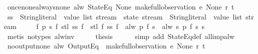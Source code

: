 \begin{isabellebody}
{\isafoldproof}%
%
\isadelimproof
\isanewline
%
\endisadelimproof
\isanewline
{}\isamarkupfalse%
\ once{\isacharunderscore}none{\isacharunderscore}always{\isacharunderscore}none{\isacharcolon}\ {\isachardoublequoteopen}alw\ {\isacharparenleft}StateEq\ None{\isacharparenright}\ {\isacharparenleft}make{\isacharunderscore}full{\isacharunderscore}observation\ e\ None\ r\ t{\isacharparenright}{\isachardoublequoteclose}\isanewline
%
\isadelimproof
%
\endisadelimproof
%
\isatagproof
{}\isamarkupfalse%
\ {\isacharminus}\isanewline
\ \ \isamarkupfalse%
\ ss\ {\isacharcolon}{\isacharcolon}\ {\isachardoublequoteopen}{\isacharparenleft}{\isacharparenleft}String{\isachardot}literal\ {\isasymtimes}\ value\ list{\isacharparenright}\ stream\ {\isasymRightarrow}\ state\ stream{\isacharparenright}\ {\isasymRightarrow}\ {\isacharparenleft}String{\isachardot}literal\ {\isasymtimes}\ value\ list{\isacharparenright}\ stream{\isachardoublequoteclose}\ \isanewline
\ \ \ \ {\isachardoublequoteopen}{\isasymforall}f\ p\ s{\isachardot}\ f\ {\isacharparenleft}stl\ {\isacharparenleft}ss\ f{\isacharparenright}{\isacharparenright}\ {\isasymnoteq}\ stl\ {\isacharparenleft}f\ {\isacharparenleft}ss\ f{\isacharparenright}{\isacharparenright}\ {\isasymor}\ alw\ p\ {\isacharparenleft}f\ s{\isacharparenright}\ {\isacharequal}\ alw\ {\isacharparenleft}{\isasymlambda}s{\isachardot}\ p\ {\isacharparenleft}f\ s{\isacharparenright}{\isacharparenright}\ s{\isachardoublequoteclose}\isanewline
\ \ \ \ \isamarkupfalse%
\ {\isacharparenleft}metis\ {\isacharparenleft}no{\isacharunderscore}types{\isacharparenright}\ alw{\isacharunderscore}inv{\isacharparenright}\isanewline
\ \ \isamarkupfalse%
\ \isamarkupfalse%
\ {\isacharquery}thesis\isanewline
\ \ \ \ \isamarkupfalse%
\ {\isacharparenleft}simp\ add{\isacharcolon}\ StateEq{\isacharunderscore}def\ all{\isacharunderscore}imp{\isacharunderscore}alw{\isacharparenright}\isanewline
{}\isamarkupfalse%
%
\endisatagproof
{\isafoldproof}%
%
\isadelimproof
\isanewline
%
\endisadelimproof
\isanewline
{}\isamarkupfalse%
\ no{\isacharunderscore}output{\isacharunderscore}none{\isacharcolon}\ {\isachardoublequoteopen}alw\ {\isacharparenleft}OutputEq\ {\isacharbrackleft}{\isacharbrackright}{\isacharparenright}\ {\isacharparenleft}make{\isacharunderscore}full{\isacharunderscore}observation\ e\ None\ r\ t{\isacharparenright}{\isachardoublequoteclose}\isanewline
%
\isadelimproof
%
\endisadelimproof
%
\isatagproof

\end{isabellebody}
